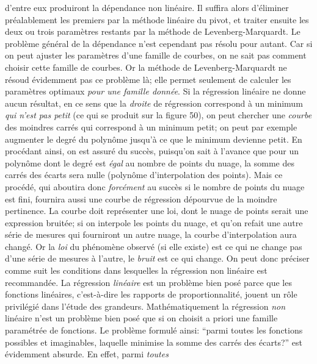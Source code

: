 d'entre eux produiront la d\'ependance non lin\'eaire. Il suffira alors 
d'\'eliminer pr\'ealablement les premiers par la m\'ethode lin\'eaire 
du pivot, et traiter ensuite les deux ou trois param\`etres restants par 
la m\'ethode de Levenberg-Marquardt. 
\medskip 
Le probl\`eme g\'en\'eral de la d\'ependance n'est cependant pas
r\'esolu pour autant. Car si on peut ajuster les param\`etres d'une 
famille de courbes, on ne sait pas comment choisir cette famille de 
courbes.  Or la m\'ethode de Levenberg-Marquardt ne r\'esoud \'evidemment
pas ce probl\`eme l\`a;  elle permet seulement de calculer les param\`etres 
optimaux {\it pour une famille donn\'ee}.
\medskip 
Si la r\'egression lin\'eaire ne donne aucun r\'esultat, en ce sens 
que la {\it droite} de r\'egression correspond \`a un minimum {\it 
qui n'est pas petit} (ce qui se produit sur la figure 50), on peut 
chercher une {\it courbe} des moindres carr\'es qui correspond \`a un 
minimum petit; on peut par exemple augmenter le degr\'e du polyn\^ome 
jusqu'\`a ce que le minimum devienne petit. En proc\'edant ainsi, on est 
assur\'e du succ\`es, puisqu'on sait \`a l'avance que pour un polyn\^ome 
dont le degr\'e est {\it \'egal} au nombre de points du nuage, la somme
des carr\'es des \'ecarts sera nulle (polyn\^ome d'interpolation des 
points). Mais ce proc\'ed\'e, qui aboutira donc {\it forc\'ement} au 
succ\`es si le nombre de points du nuage est fini, fournira aussi une 
courbe de r\'egression d\'epourvue de la moindre pertinence. La courbe 
doit repr\'esenter une loi, dont le nuage de points serait une expression 
bruit\'ee; si on interpole les points du nuage, et qu'on refait une autre 
s\'erie de mesures qui fourniront un autre nuage, la courbe 
d'interpolation aura chang\'e. Or la {\it loi} du ph\'enom\`ene observ\'e 
(si elle existe) est ce qui ne change pas d'une s\'erie de mesures \`a 
l'autre, le {\it bruit} est ce qui change. 
\medskip 
On peut donc pr\'eciser comme suit les conditions dans lesquelles la 
r\'egression non lin\'eaire est recommand\'ee.  La r\'egression {\it 
lin\'eaire} est un probl\`eme bien pos\'e parce que les fonctions 
lin\'eaires, c'est-\`a-dire les rapports de proportionnalit\'e, jouent un 
r\^ole privil\'egi\'e dans l'\'etude des grandeurs. Math\'ematiquement
la r\'egression {\it non} lin\'eaire n'est un probl\`eme bien pos\'e que
si on choisit a priori une famille param\'etr\'ee de fonctions. 
Le probl\`eme formul\'e ainsi: ``parmi toutes les fonctions 
possibles et imaginables, laquelle minimise la somme des carr\'es
des \'ecarts?'' est \'evidemment absurde. En effet, parmi {\it toutes} 
